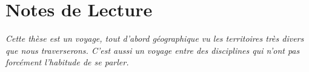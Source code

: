 



\begingroup
\let\clearpage\relax
\let\cleardoublepage\relax
\let\cleardoublepage\relax


\chapter*{Notes de Lecture}



\textit{Cette thèse est un voyage, tout d'abord géographique vu les territoires très divers que nous traverserons. C'est aussi un voyage entre des disciplines qui n'ont pas forcément l'habitude de se parler.} %




\endgroup			

\vfill



